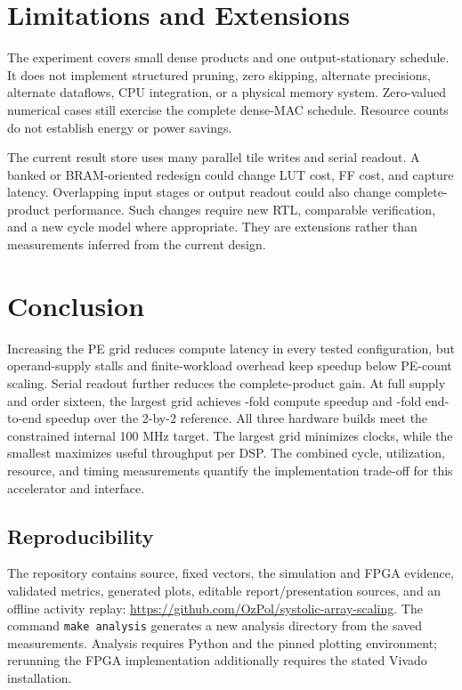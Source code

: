 \documentclass[conference]{IEEEtran}
\begin{document}
\section{Limitations and Extensions}
The experiment covers small dense products and one output-stationary schedule. It does not implement structured pruning, zero skipping, alternate precisions, alternate dataflows, CPU integration, or a physical memory system. Zero-valued numerical cases still exercise the complete dense-MAC schedule. Resource counts do not establish energy or power savings.

The current result store uses many parallel tile writes and serial readout. A banked or BRAM-oriented redesign could change LUT cost, FF cost, and capture latency. Overlapping input stages or output readout could also change complete-product performance. Such changes require new RTL, comparable verification, and a new cycle model where appropriate. They are extensions rather than measurements inferred from the current design.

\section{Conclusion}
Increasing the PE grid reduces compute latency in every tested configuration, but operand-supply stalls and finite-workload overhead keep speedup below PE-count scaling. Serial readout further reduces the complete-product gain. At full supply and order sixteen, the largest grid achieves \WideSpeedup{}-fold compute speedup and \LargeEndSpeedup{}-fold end-to-end speedup over the 2-by-2 reference. All three hardware builds meet the constrained internal 100 MHz target. The largest grid minimizes clocks, while the smallest maximizes useful throughput per DSP. The combined cycle, utilization, resource, and timing measurements quantify the implementation trade-off for this accelerator and interface.

\begin{samepage}
\section*{Reproducibility}
The repository contains source, fixed vectors, the simulation and FPGA evidence, validated metrics, generated plots, editable report/presentation sources, and an offline activity replay: \url{https://github.com/OzPol/systolic-array-scaling}. The command \texttt{make analysis} generates a new analysis directory from the saved measurements. Analysis requires Python and the pinned plotting environment; rerunning the FPGA implementation additionally requires the stated Vivado installation.
\end{samepage}
\end{document}

